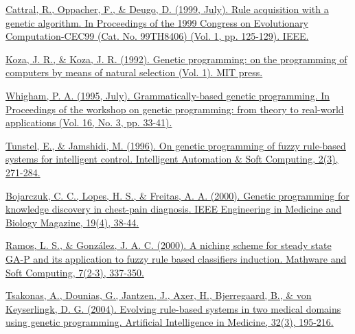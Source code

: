 \begin{thebibliography}{9}

	\href{https://ieeexplore.ieee.org/abstract/document/781916}{Cattral, R., Oppacher, F., \& Deugo, D. (1999, July). Rule acquisition with a genetic algorithm. In Proceedings of the 1999 Congress on Evolutionary Computation-CEC99 (Cat. No. 99TH8406) (Vol. 1, pp. 125-129). IEEE.}


	\href{https://mitpress.mit.edu/books/genetic-programming}{Koza, J. R., \& Koza, J. R. (1992). Genetic programming: on the programming of computers by means of natural selection (Vol. 1). MIT press.}


	\href{https://www.researchgate.net/profile/Pa-Whigham/publication/2450222_Grammatically-based_Genetic_Programming/links/55c3c89908aebc967df1b765/Grammatically-based-Genetic-Programming.pdf}{Whigham, P. A. (1995, July). Grammatically-based genetic programming. In Proceedings of the workshop on genetic programming: from theory to real-world applications (Vol. 16, No. 3, pp. 33-41).}


	\href{https://www.tandfonline.com/doi/abs/10.1080/10798587.1996.10750674}{Tunstel, E., \& Jamshidi, M. (1996). On genetic programming of fuzzy rule-based systems for intelligent control. Intelligent Automation \& Soft Computing, 2(3), 271-284.}


	\href{https://ieeexplore.ieee.org/document/853480}{Bojarczuk, C. C., Lopes, H. S., \& Freitas, A. A. (2000). Genetic programming for knowledge discovery in chest-pain diagnosis. IEEE Engineering in Medicine and Biology Magazine, 19(4), 38-44.}


	\href{http://dmle.icmat.es/revistas/detalle.php?numero=1954}{Ramos, L. S., \& González, J. A. C. (2000). A niching scheme for steady state GA-P and its application to fuzzy rule based classifiers induction. Mathware and Soft Computing, 7(2-3), 337-350.}


	\href{https://www.sciencedirect.com/science/article/pii/S0933365704001058}{Tsakonas, A., Dounias, G., Jantzen, J., Axer, H., Bjerregaard, B., \& von Keyserlingk, D. G. (2004). Evolving rule-based systems in two medical domains using genetic programming. Artificial Intelligence in Medicine, 32(3), 195-216.}


\end{thebibliography}
